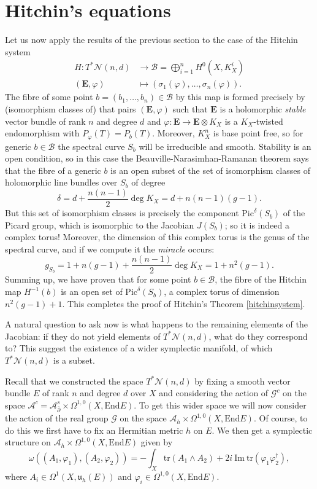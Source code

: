 \documentclass[12pt,a4paper]{book}
\theoremstyle{definition} \newtheorem{defn}[thm]{Definition}
\theoremstyle{definition} \newtheorem{ejemplo}[thm]{Example}
\theoremstyle{remark} \newtheorem{rem}[thm]{Remark}
\def\AA{\mathscr{A}}
\def\BB{\mathscr{B}}
\def\GG{\mathscr{G}}
\def\tr{\mathrm{tr}}
\def\End{\mathrm{End}}
\def\Bun{\mathscr{N}}
\def\Pic{\mathrm{Pic}}
\def\delbar{\bar{\partial}}
\newcommand{\ve}[1]{\mathbf{#1}}
\begin{document}
	\section{Hitchin's equations}
	Let us now apply the results of the previous section to the case of the Hitchin system
	\begin{align*}
	  H:T^*\Bun(n,d)& \longrightarrow \BB = \bigoplus_{i=1}^n H^0(X,K_X^i) \\
	  (\ve{E},\varphi) &\longmapsto (\sigma_1(\varphi),\dots,\sigma_n(\varphi)). 
	  \end{align*}
	  The fibre of some point $b=(b_1,\dots,b_n)\in \BB$ by this map is formed precisely by (isomorphism classes of) that pairs $(\ve{E},\varphi)$ such that $\ve{E}$ is a holomorphic \textit{stable} vector bundle of rank $n$ and degree $d$ and $\varphi:\ve{E}\rightarrow \ve{E}\otimes K_X$ is a $K_X$-twisted endomorphism with $P_\varphi(T)=P_b(T)$. Moreover, $K_X^n$ is base point free, so for generic $b\in \BB$ the spectral curve $S_b$ will be irreducible and smooth. Stability is an open condition, so in this case the Beauville-Narasimhan-Ramanan theorem says that the fibre of a generic $b$ is an open subset of the set of isomorphism classes of holomorphic line bundles over $S_b$ of degree 
	  $$\delta=d+\frac{n(n-1)}{2}\deg K_X=d+n(n-1)(g-1).$$
	  But this set of isomorphism classes is precisely the component $\Pic^\delta (S_b)$ of the Picard group, which is isomorphic to the Jacobian $J(S_b)$; so it is indeed a complex torus! Moreover, the dimension of this complex torus is the genus of the spectral curve, and if we compute it the \textit{miracle} occurs:
	  \begin{equation*}
	    g_{S_b}=1+n(g-1)+\frac{n(n-1)}{2}\deg K_X=1+n^2(g-1).
	  \end{equation*}
	  Summing up, we have proven that for some point $b\in \BB$, the fibre of the Hitchin map $H^{-1}(b)$ is an open set of $\Pic^{\delta}(S_b)$, a complex torus of dimension $n^2(g-1)+1$. This completes the proof of Hitchin's Theorem \ref{hitchinsystem}.

	  A natural question to ask now is what happens to the remaining elements of the Jacobian: if they do not yield elements of $T^*\Bun(n,d)$, what do they correspond to? This suggest the existence of a wider symplectic manifold, of which $T^*\Bun(n,d)$ is a subset. 

	  Recall that we constructed the space $T^*\Bun(n,d)$ by fixing a smooth vector bundle $E$ of rank $n$ and degree $d$ over $X$ and considering the action of $\GG^c$ on the space $\AA^c=\AA_{\delbar}^s \times \Omega^{1,0}(X,\End E)$. To get this wider space we will now consider the action of the real group $\GG$ on the space $\AA_h \times \Omega^{1,0}(X,\End E)$. Of course, to do this we first have to fix an Hermitian metric $h$ on $E$. We then get a symplectic structure on $\AA_h \times \Omega^{1,0}(X,\End E)$ given by
	  \begin{equation*}
	    \omega\left( (A_1,\varphi_1),(A_2,\varphi_2) \right)=-\int_X \tr(A_1\wedge A_2) +2i\ \mathrm{Im}\ \tr(\varphi_1 \varphi_2^\dagger),
	  \end{equation*}
	  where $A_i \in \Omega^{1}(X,\mathfrak{u}_h(E))$ and $\varphi_i \in \Omega^{1,0}(X,\End E)$.
\end{document}

